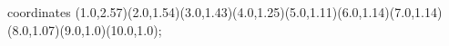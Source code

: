 					coordinates { (1.0,2.57)(2.0,1.54)(3.0,1.43)(4.0,1.25)(5.0,1.11)(6.0,1.14)(7.0,1.14)(8.0,1.07)(9.0,1.0)(10.0,1.0)};